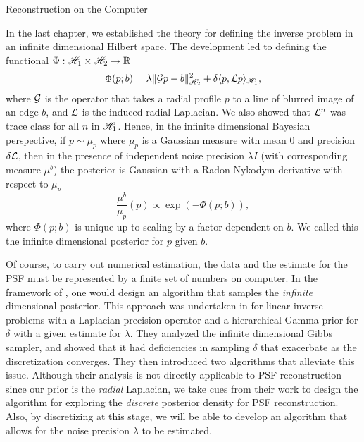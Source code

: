 \setlength{\parindent}{2ex}
\newcommand{\Ab}{{\bf A}}
\newcommand{\N}{\mathcal{N}}
\begin{chapter}{Reconstruction on the Computer}\label{chapter:computational}

In the last chapter, we established the theory for defining the inverse problem in an infinite dimensional Hilbert space. 
The development led to defining the functional $\Phi:\mathscr H_1 \times \mathscr H_2 \to \mathbb R$
\begin{equation} \label{eq:regularizingFunctional}
  \Phi(p; b) = \lambda\|\mathcal G p - b\|_{\mathscr H_2}^2 + \delta\langle p, \mathcal L p\rangle_{\mathscr H_1},
\end{equation}
where $\mathcal G$ is the operator that takes a radial profile $p$ to a line of blurred image of an edge $b$, and $\mathcal L$ is the induced radial Laplacian. 
We also showed that $\mathcal L^n$ was trace class for all $n$ in $\mathscr H_1$. %
Hence, in the infinite dimensional Bayesian perspective, if $p\sim \mu_p$ where $\mu_p$ is a Gaussian measure with mean $0$ and precision $\delta \mathcal L$, then in the presence of independent noise precision $\lambda I$ (with corresponding measure $\mu^b$) the posterior is Gaussian with a Radon-Nykodym derivative with respect to $\mu_p$
\begin{equation} \label{eq:posteriorInfinite}
  \frac{\mu^b}{\mu_p}(p) \propto \exp\left(-\Phi(p;b)\right),
\end{equation}
where $\Phi(p;b)$ is unique up to scaling by a factor dependent on $b$.
We called this the infinite dimensional posterior for $p$ given $b$.

Of course, to carry out numerical estimation, the data and the estimate for the PSF must be represented by a finite set of numbers on computer.
In the framework of \citep{stuart2010}, one would design an algorithm that samples the \emph{infinite} dimensional posterior. 
This approach was undertaken in \citep{agapiou2014analysis} for linear inverse problems with a Laplacian precision operator and a hierarchical Gamma prior for $\delta$ with a given estimate for $\lambda$. 
They analyzed the infinite dimensional Gibbs sampler, and showed that it had deficiencies in sampling $\delta$ that exacerbate as the discretization converges.
They then introduced two algorithms that alleviate this issue.
Although their analysis is not directly applicable to PSF reconstruction since our prior is the \emph{radial} Laplacian, we take cues from their work to design the algorithm for exploring the \emph{discrete} posterior density for PSF reconstruction.
Also, by discretizing at this stage, we will be able to develop an algorithm that allows for the noise precision $\lambda$ to be estimated.


\end{chapter}
